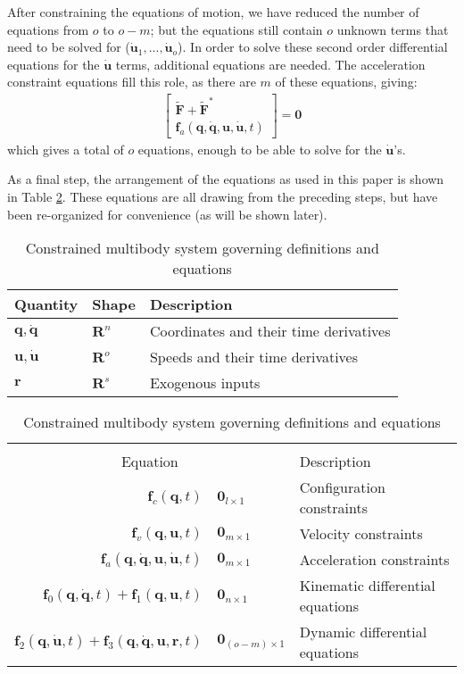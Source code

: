 \documentclass[smallcondensed,final]{svjour3}                     %
\begin{document}
After constraining the equations of motion, we have reduced the number of
equations from $o$ to $o-m$; but the equations still contain $o$ unknown terms
that need to be solved for ($\dot{\mathbf{u}}_1,...,\dot{\mathbf{u}}_o$).
In order to solve these second order differential equations for the
$\dot{\mathbf{u}}$ terms, additional equations are needed.
The acceleration constraint equations fill this role, as there are $m$ of these
equations, giving:
\begin{align}
\label{eq:F_Fstar_f_a}
\begin{bmatrix}
\tilde{\mathbf{F}} + \tilde{\mathbf{F}}^* \\
\mathbf{f}_a (\mathbf{q}, \dot{\mathbf{q}}, \mathbf{u}, \dot{\mathbf{u}}, t)
\end{bmatrix} = \mathbf{0}
\end{align}
which gives a total of $o$ equations, enough to be able to solve for the
$\dot{\mathbf{u}}$'s.

As a final step, the arrangement of the equations as used in this paper is
shown in Table \ref{table:assumptions}.
These equations are all drawing from the preceding steps, but have been
re-organized for convenience (as will be shown later).

\begin{table}[htbp]
  \centering
  \caption{Constrained multibody system governing definitions and equations}
  \label{table:assumptions}
  \begin{tabular}[c]{l l l}
    Quantity & Shape & Description\\
    \hline
    $\bm{q},\bm{\dot{q}}$ & $\mathbf{R}^n$ & Coordinates and their time
    derivatives\\
    $\bm{u}, \bm{\dot{u}}$ & $\mathbf{R}^o$ & Speeds and their time derivatives\\
    $\bm{r}$ & $\mathbf{R}^s$ & Exogenous inputs \\
  \end{tabular}
  \begin{tabular}[c]{r @{ $=$ } l l}
    \multicolumn{3}{c}{ } \\
    \multicolumn{2}{c}{Equation} & Description \\
    \hline
    $\bm{f}_{c}(\bm{q}, t)$ & $\bm{0}_{l \times 1}$ & Configuration constraints \\
    $\bm{f}_{v}(\bm{q}, \bm{u}, t)$ & $\bm{0}_{m \times 1}$ & Velocity constraints \\
    $\bm{f}_{a}(\bm{q}, \bm{\dot{q}}, \bm{u}, \bm{\dot{u}}, t)$ & $\bm{0}_{m
    \times 1}$ & Acceleration constraints \\
    $\bm{f}_{0}(\bm{q}, \bm{\dot{q}}, t) + \bm{f}_{1}(\bm{q}, \bm{u}, t)$ &
    $\bm{0}_{n \times 1}$ & Kinematic differential equations \\
    $\bm{f}_{2}(\bm{q}, \bm{\dot{u}}, t) + \bm{f}_{3}(\bm{q}, \bm{\dot{q}},
    \bm{u}, \bm{r}, t)$ & $\bm{0}_{(o - m) \times 1}$ & Dynamic differential equations
  \end{tabular}
\end{table}
\end{document}
